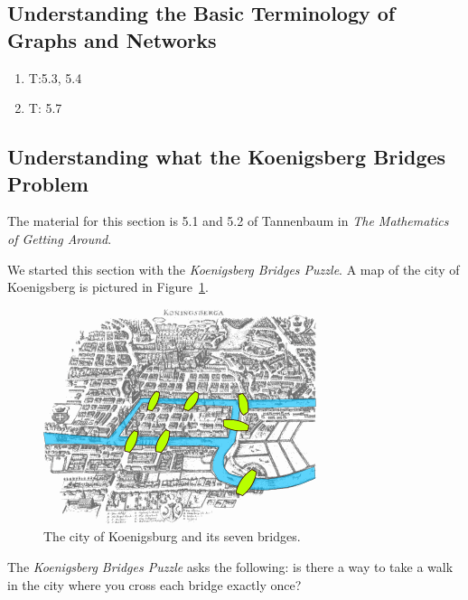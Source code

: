 \documentclass[11pt, letterpaper]{article}
\begin{document}
\subsection{Understanding the Basic Terminology of Graphs and Networks}
\begin{enumerate}
	\item T:5.3, 5.4
	\item T: 5.7
\end{enumerate}

\subsection{Understanding what the Koenigsberg Bridges Problem}
The material for this section is 5.1 and 5.2 of Tannenbaum in \emph{The Mathematics of Getting Around}. 

We started this section with the \emph{Koenigsberg Bridges Puzzle}. 
A map of the city of Koenigsberg is pictured in Figure~\ref{F:seven-bridges}.
\begin{figure}[h]
	\begin{center}
		\includegraphics[scale=0.5]{konigsberg_bridges.png}
	\end{center}
	\caption{The city of Koenigsburg and its seven bridges.}\label{F:seven-bridges}
\end{figure}
The \emph{Koenigsberg Bridges Puzzle} asks the following: is there a way to take a walk in the city where you cross each bridge exactly once?
\end{document}
